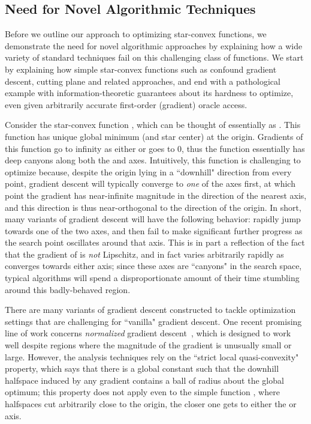 \documentclass[11pt,letter]{article}
\numberwithin{nTheorems}{section}
\begin{document}
\subsection{Need for Novel Algorithmic Techniques}
\label{sect:Hardness}

Before we outline our approach to optimizing star-convex functions, we demonstrate the need for novel algorithmic approaches by explaining how a wide variety of standard techniques fail on this challenging class of functions. We start by explaining how simple star-convex functions such as  confound gradient descent, cutting plane and related approaches, and end with a pathological example with information-theoretic guarantees about its hardness to optimize, even given arbitrarily accurate first-order (gradient) oracle access.

Consider the star-convex function , which can be thought of essentially as . This function has unique global minimum (and star center) at the origin. Gradients of this function go to infinity as either  or  goes to 0, thus the function essentially has deep canyons along both the  and  axes. Intuitively, this function is challenging to optimize because, despite the origin lying in a ``downhill" direction from every point, gradient descent will typically converge to \emph{one} of the axes first, at which point the gradient has near-infinite magnitude in the direction of the nearest axis, and this direction is thus near-orthogonal to the direction of the origin. In short, many variants of gradient descent will have the following behavior: rapidly jump towards one of the two axes, and then fail to make significant further progress as the search point oscillates around that axis. This is in part a reflection of the fact that the gradient of  is \emph{not} Lipschitz, and in fact varies arbitrarily rapidly as  converges towards either axis; since these axes are ``canyons" in the search space, typical algorithms will spend a disproportionate amount of their time stumbling around this badly-behaved region.

There are many variants of gradient descent constructed to tackle optimization settings that are challenging for ``vanilla" gradient descent. One recent promising line of work concerns \emph{normalized} gradient descent~\cite{Hazan:2015}, which is designed to work well despite regions where the magnitude of the gradient is unusually small or large. However, the analysis techniques rely on the ``strict local quasi-convexity" property, which says that there is a global constant  such that the downhill halfspace induced by any gradient contains a ball of radius  about the global optimum; this property does not apply even to the simple function , where halfspaces cut arbitrarily close to the origin, the closer one gets to either the  or  axis.
\end{document}
